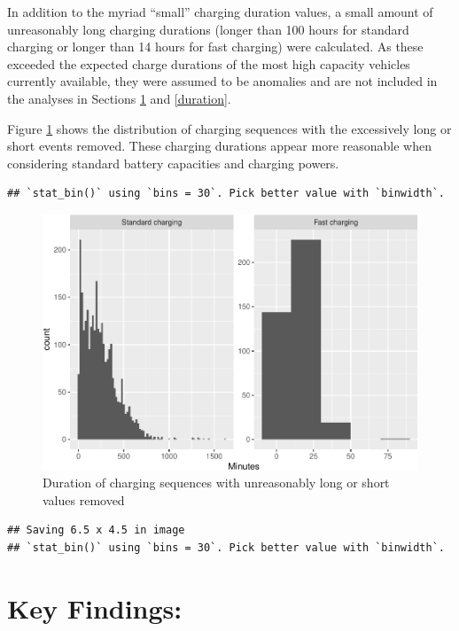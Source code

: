 \documentclass[]{article}
\begin{document}
In addition to the myriad ``small'' charging duration values, a small
amount of unreasonably long charging durations (longer than 100 hours
for standard charging or longer than 14 hours for fast charging) were
calculated. As these exceeded the expected charge durations of the most
high capacity vehicles currently available, they were assumed to be
anomalies and are not included in the analyses in Sections
\ref{keyFindings} and \ref{duration}.

Figure \ref{fig:longDuration} shows the distribution of charging
sequences with the excessively long or short events removed. These
charging durations appear more reasonable when considering standard
battery capacities and charging powers.

\begin{verbatim}
## `stat_bin()` using `bins = 30`. Pick better value with `binwidth`.
\end{verbatim}

\begin{figure}
\centering
\includegraphics{EVBB_report_files/figure-latex/longDuration-1.pdf}
\caption{\label{fig:longDuration}Duration of charging sequences with
unreasonably long or short values removed}
\end{figure}

\begin{verbatim}
## Saving 6.5 x 4.5 in image
## `stat_bin()` using `bins = 30`. Pick better value with `binwidth`.
\end{verbatim}

\section{Key Findings:}\label{keyFindings}
\end{document}
